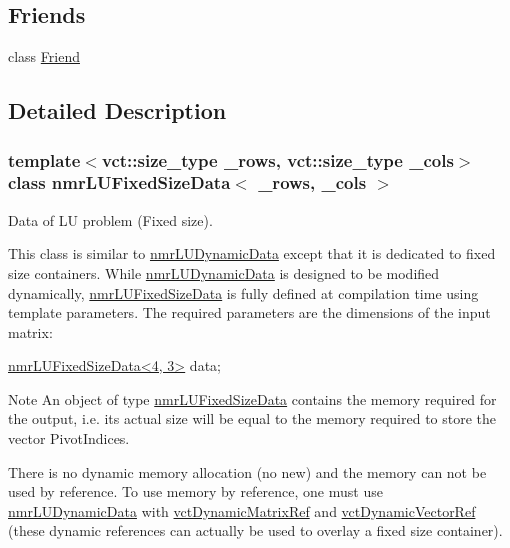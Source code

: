 \subsection*{Friends}
\begin{DoxyCompactItemize}
\item 
class \hyperlink{classnmr_l_u_fixed_size_data_a7f8321d57e81bc613d5dbef3410ba70e}{Friend}
\end{DoxyCompactItemize}


\subsection{Detailed Description}
\subsubsection*{template$<$vct\+::size\+\_\+type \+\_\+rows, vct\+::size\+\_\+type \+\_\+cols$>$class nmr\+L\+U\+Fixed\+Size\+Data$<$ \+\_\+rows, \+\_\+cols $>$}

Data of L\+U problem (Fixed size). 

This class is similar to \hyperlink{classnmr_l_u_dynamic_data}{nmr\+L\+U\+Dynamic\+Data} except that it is dedicated to fixed size containers. While \hyperlink{classnmr_l_u_dynamic_data}{nmr\+L\+U\+Dynamic\+Data} is designed to be modified dynamically, \hyperlink{classnmr_l_u_fixed_size_data}{nmr\+L\+U\+Fixed\+Size\+Data} is fully defined at compilation time using template parameters. The required parameters are the dimensions of the input matrix\+: 
\begin{DoxyCode}
\hyperlink{classnmr_l_u_fixed_size_data}{nmrLUFixedSizeData<4, 3>} data;
\end{DoxyCode}


\begin{DoxyNote}{Note}
An object of type \hyperlink{classnmr_l_u_fixed_size_data}{nmr\+L\+U\+Fixed\+Size\+Data} contains the memory required for the output, i.\+e. its actual size will be equal to the memory required to store the vector Pivot\+Indices.

There is no dynamic memory allocation (no {\ttfamily new}) and the memory can not be used by reference. To use memory by reference, one must use \hyperlink{classnmr_l_u_dynamic_data}{nmr\+L\+U\+Dynamic\+Data} with \hyperlink{classvct_dynamic_matrix_ref}{vct\+Dynamic\+Matrix\+Ref} and \hyperlink{classvct_dynamic_vector_ref}{vct\+Dynamic\+Vector\+Ref} (these dynamic references can actually be used to overlay a fixed size container). 
\end{DoxyNote}


